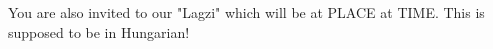 You are also invited to our "Lagzi" which will be at PLACE at TIME.
This is supposed to be in Hungarian!
